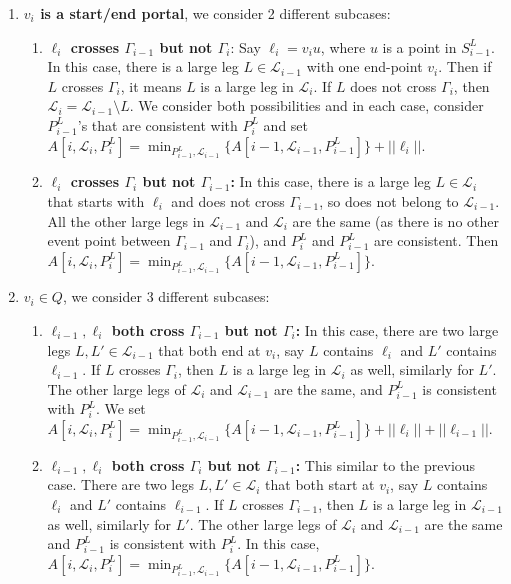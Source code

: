 \documentclass[pdflatex,sn-mathphys-num]{sn-jnl}
\theoremstyle{thmstyleone}
\begin{document}
\begin{enumerate}
    \item \textbf{$v_i$ is a start/end portal}, we consider 2 different subcases:
    \begin{enumerate}
        \item \textbf{$\ell_i$ crosses $\Gamma_{i-1}$ but not $\Gamma_i$}:
        Say $\ell_i=v_iu$, where $u$ is a point in $S^L_{i-1}$. 
        In this case, there is a large leg $L\in\mathcal L_{i-1}$ with one end-point $v_i$. Then if $L$ crosses $\Gamma_i$, it means $L$ is a large leg in $\mathcal L_i$. If $L$ does not cross $\Gamma_i$, then $\mathcal L_i=\mathcal L_{i-1} \setminus L$. We consider both possibilities and in each case, consider $P^L_{i-1}$'s that are consistent %
        with $P^L_i$ and 
        set $A[i,\mathcal L_i,P^L_i]=\min_{P^L_{i-1},\mathcal L_{i-1}} \{A[i-1,\mathcal L_{i-1},P^L_{i-1}]\}+||\ell_i||$.
        
        \item \textbf{$\ell_i$ crosses $\Gamma_i$ but not $\Gamma_{i-1}$:}
        In this case, there is a large leg $L\in\mathcal L_i$ that starts with $\ell_i$ and does not cross $\Gamma_{i-1}$, so does not belong to $\mathcal L_{i-1}$. All the other large legs in $\mathcal L_{i-1}$ and $\mathcal L_i$ are the same (as there is no other event point between $\Gamma_{i-1}$ and $\Gamma_i$), and $P^L_i$ and $P^L_{i-1}$ are consistent. Then 
        $A[i,\mathcal L_i,P^L_i]=\min_{P^L_{i-1},\mathcal L_{i-1}} \{A[i-1,\mathcal L_{i-1},P^L_{i-1}]\}$.
    \end{enumerate}
    \item \textbf{$v_i\in Q$}, we consider 3 different subcases:
    \begin{enumerate}
        \item \textbf{$\ell_{i-1},\ell_i$ both cross $\Gamma_{i-1}$ but not $\Gamma_i$:} In this case,
        there are two large legs $L,L'\in\mathcal L_{i-1}$ that both end at $v_i$, say $L$ contains $\ell_i$ and $L'$ contains $\ell_{i-1}$. If $L$ crosses $\Gamma_i$, then $L$ is a large leg in $\mathcal L_i$ as well, similarly for $L'.$ The other large legs of $\mathcal L_i$ and $\mathcal L_{i-1}$ are the same, and $P^L_{i-1}$ is consistent with $P^L_i$. We set $A[i,\mathcal L_i,P^L_i]= \min_{P^L_{i-1},\mathcal L_{i-1}}\{A[i-1,\mathcal L_{i-1},P^L_{i-1}]\}+||\ell_i||+||\ell_{i-1}||$.

        \item \textbf{$\ell_{i-1},\ell_i$ both cross $\Gamma_i$ but not $\Gamma_{i-1}$:} This similar to the previous case. There are two legs $L,L'\in\mathcal L_i$ that both start at $v_i$, say $L$ contains $\ell_i$ and $L'$ contains $\ell_{i-1}$. If $L$ crosses $\Gamma_{i-1}$, then $L$ is a large leg in $\mathcal L_{i-1}$ as well, similarly for $L'$. The other large legs of $\mathcal L_i$ and $\mathcal L_{i-1}$ are the same and $P^L_{i-1}$ is consistent with $P^L_i$.  In this case, $A[i,\mathcal L_i,P^L_i]=\min_{P^L_{i-1},\mathcal L_{i-1}} \{A[i-1,\mathcal L_{i-1},P^L_{i-1}]\}$.
        

\end{enumerate}
\end{enumerate}
\end{document}
